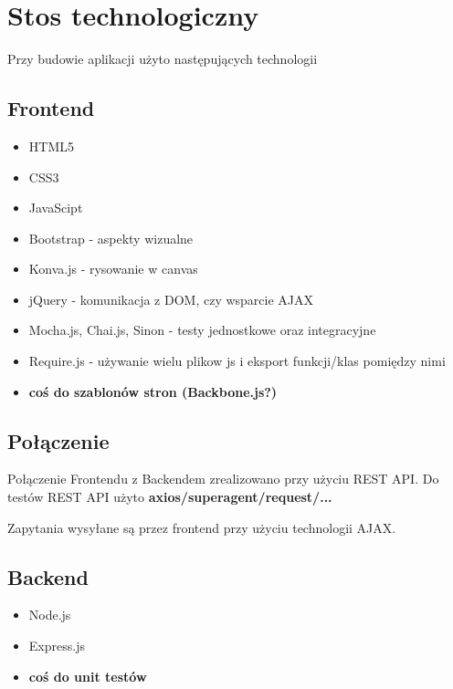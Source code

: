 \section{Stos technologiczny}

Przy budowie aplikacji użyto następujących technologii

\subsection{Frontend}
\begin{itemize}
	\item HTML5
	\item CSS3
	\item JavaScipt
	\item Bootstrap - aspekty wizualne
	\item Konva.js - rysowanie w canvas
	\item jQuery - komunikacja z DOM, czy wsparcie AJAX
	\item Mocha.js, Chai.js, Sinon - testy jednostkowe oraz integracyjne
	\item Require.js - używanie wielu plikow js i eksport funkcji/klas pomiędzy nimi
	\item \textbf{coś do szablonów stron (Backbone.js?)}
\end{itemize}

\subsection{Połączenie}
Połączenie Frontendu z Backendem zrealizowano przy użyciu REST API.
Do testów REST API użyto \textbf{axios/superagent/request/...}

Zapytania wysyłane są przez frontend przy użyciu technologii AJAX.

\subsection{Backend}
\begin{itemize}
	\item Node.js
	\item Express.js
	\item \textbf{coś do unit testów}
\end{itemize}